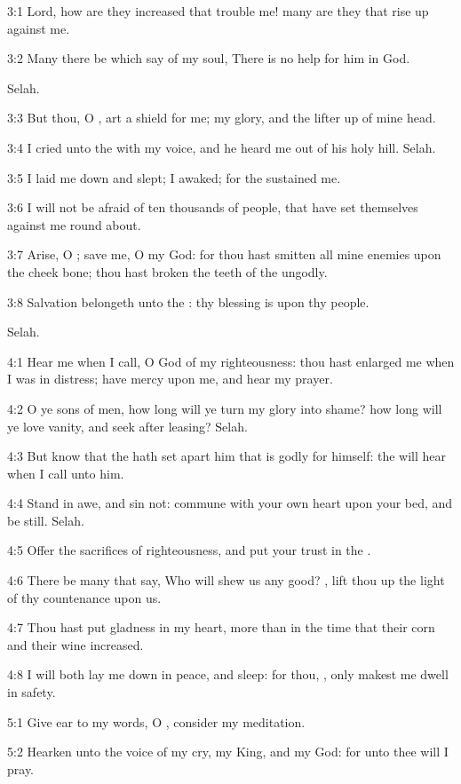 3:1 Lord, how are they increased that trouble me! many are they that
rise up against me.

3:2 Many there be which say of my soul, There is no help for him in
God.

Selah.

3:3 But thou, O \LORD, art a shield for me; my glory, and the lifter up
of mine head.

3:4 I cried unto the \LORD with my voice, and he heard me out of his
holy hill. Selah.

3:5 I laid me down and slept; I awaked; for the \LORD sustained me.

3:6 I will not be afraid of ten thousands of people, that have set
themselves against me round about.

3:7 Arise, O \LORD; save me, O my God: for thou hast smitten all mine
enemies upon the cheek bone; thou hast broken the teeth of the
ungodly.

3:8 Salvation belongeth unto the \LORD: thy blessing is upon thy
people.

Selah.



4:1 Hear me when I call, O God of my righteousness: thou hast enlarged
me when I was in distress; have mercy upon me, and hear my prayer.

4:2 O ye sons of men, how long will ye turn my glory into shame? how
long will ye love vanity, and seek after leasing? Selah.

4:3 But know that the \LORD hath set apart him that is godly for
himself: the \LORD will hear when I call unto him.

4:4 Stand in awe, and sin not: commune with your own heart upon your
bed, and be still. Selah.

4:5 Offer the sacrifices of righteousness, and put your trust in the
\LORD.

4:6 There be many that say, Who will shew us any good? \LORD, lift thou
up the light of thy countenance upon us.

4:7 Thou hast put gladness in my heart, more than in the time that
their corn and their wine increased.

4:8 I will both lay me down in peace, and sleep: for thou, \LORD, only
makest me dwell in safety.



5:1 Give ear to my words, O \LORD, consider my meditation.

5:2 Hearken unto the voice of my cry, my King, and my God: for unto
thee will I pray.

